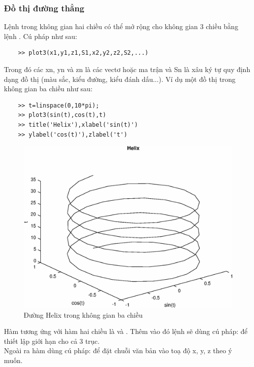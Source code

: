 \documentclass[12pt,a4paper]{article}
\begin{document}
\subsubsection{Đồ thị đường thẳng}
Lệnh  trong không gian hai chiều có thể mở rộng cho không gian 3 chiều bằng lệnh . Cú pháp như sau:
\begin{lstlisting}
	>> plot3(x1,y1,z1,S1,x2,y2,z2,S2,...)
\end{lstlisting}
Trong đó các xn, yn và zn là các vectơ hoặc ma trận và Sn là xâu ký tự quy định dạng đồ thị (màu sắc, kiểu đường, kiểu đánh dấu...). Ví dụ một đồ thị trong không gian ba chiều như sau:
\begin{lstlisting}
	>> t=linspace(0,10*pi);
	>> plot3(sin(t),cos(t),t)
	>> title('Helix'),xlabel('sin(t)')
	>> ylabel('cos(t)'),zlabel('t')
\end{lstlisting}
\begin{center}
	\begin{figure}[H]
	\begin{center}
		\includegraphics[scale=0.6]{hinhtieuluan/dothi15}
	\end{center}
		\caption{Đường Helix trong không gian ba chiều}
		\label{refdothi15}
	\end{figure}
\end{center}
Hàm  tương ứng với hàm hai chiều là  và . Thêm vào đó lệnh  sẽ dùng cú pháp:  để thiết lập giới hạn cho cả 3 trục.\\
Ngoài ra hàm  dùng cú pháp:  để đặt chuỗi văn bản vào toạ độ x, y, z theo ý muốn.
\end{document}
